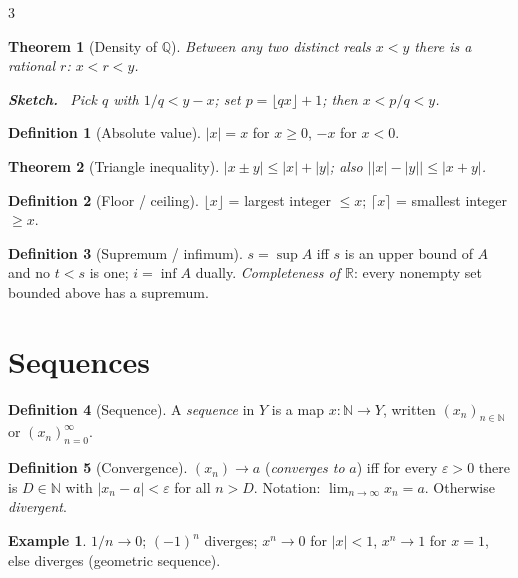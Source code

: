 \documentclass[10pt,a4paper,landscape]{article}
\theoremstyle{definition}
\newtheorem{defn}{Definition}[section]
\newtheorem{exm}{Example}[section]
\theoremstyle{plain}
\newtheorem{thm}{Theorem}[section]
\theoremstyle{remark}
\newcommand{\R}{\mathbb{R}}
\newcommand{\N}{\mathbb{N}}
\newcommand{\Q}{\mathbb{Q}}
\newcommand{\eps}{\varepsilon}
\newcommand{\abs}[1]{\lvert #1 \rvert}
\newcommand{\ceil}[1]{\lceil #1 \rceil}
\newcommand{\floor}[1]{\lfloor #1 \rfloor}
\newcommand{\oo}{\infty}
\newenvironment{proofsketch}{%
  \par\small\color{exgray}\textbf{Sketch.}\ }%
  {\par}
\begin{document}
\begin{multicols*}{3}
\begin{thm}[Density of $\Q$]
Between any two distinct reals $x<y$ there is a rational $r$: $x<r<y$.
\begin{proofsketch}
Pick $q$ with $1/q < y-x$; set $p = \floor{qx} + 1$; then $x < p/q < y$.
\end{proofsketch}
\end{thm}

\begin{defn}[Absolute value]
$\abs{x} = x$ for $x \ge 0$, $-x$ for $x<0$.
\end{defn}

\begin{thm}[Triangle inequality]
$\abs{x \pm y} \le \abs{x} + \abs{y}$; also $\bigl\lvert\abs{x}-\abs{y}\bigr\rvert \le \abs{x+y}$.
\end{thm}

\begin{defn}[Floor / ceiling]
$\floor{x}$ = largest integer $\le x$; $\ceil{x}$ = smallest integer $\ge x$.
\end{defn}

\begin{defn}[Supremum / infimum]
$s = \sup A$ iff $s$ is an upper bound of $A$ and no $t < s$ is one; $i = \inf A$ dually. \emph{Completeness of $\R$}: every nonempty set bounded above has a supremum.
\end{defn}

\section{Sequences}

\begin{defn}[Sequence]
A \emph{sequence} in $Y$ is a map $x: \N \to Y$, written $(x_n)_{n \in \N}$ or $(x_n)_{n=0}^{\oo}$.
\end{defn}

\begin{defn}[Convergence]
$(x_n) \to a$ (\emph{converges to} $a$) iff for every $\eps > 0$ there is $D \in \N$ with $\abs{x_n - a} < \eps$ for all $n > D$. Notation: $\lim_{n \to \oo} x_n = a$. Otherwise \emph{divergent}.
\end{defn}

\begin{exm}
$1/n \to 0$; $(-1)^n$ diverges; $x^n \to 0$ for $\abs{x}<1$, $x^n \to 1$ for $x=1$, else diverges (geometric sequence).
\end{exm}


\end{multicols*}
\end{document}
